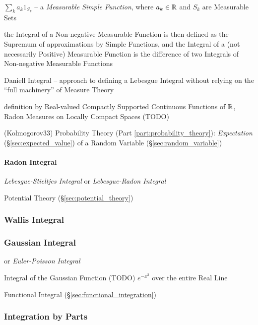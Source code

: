 $\sum_k a_k 1_{S_k}$ -- a \emph{Measurable Simple Function}, where
$a_k \in \mathbb{R}$ and $S_k$ are Measurable Sets

the Integral of a Non-negative Measurable Function is then defined as the
Supremum of approximations by Simple Functions, and the Integral of a (not
necessarily Positive) Measurable Function is the difference of two Integrals of
Non-negative Measurable Functions

Daniell Integral -- approach to defining a Lebesgue Integral without relying on
the ``full machinery'' of Measure Theory

definition by Real-valued Compactly Supported Continuous Functions of $\mathbb{R}$,
Radon Measures on Locally Compact Spaces
(TODO)

(Kolmogorov33) Probability Theory (Part \ref{part:probability_theory}):
\emph{Expectation} (\S\ref{sec:expected_value}) of a Random Variable
(\S\ref{sec:random_variable})



\paragraph{Radon Integral}\label{sec:radon_integral}\hfill

\emph{Lebesgue-Stieltjes Integral} or \emph{Lebesgue-Radon Integral}

Potential Theory (\S\ref{sec:potential_theory})



\subsubsection{Wallis Integral}\label{sec:wallis_integral}

\subsubsection{Gaussian Integral}\label{sec:gaussian_integral}

or \emph{Euler-Poisson Integral}

Integral of the Gaussian Function (TODO) $e^{-x^2}$ over the entire Real Line

\fist Functional Integral (\S\ref{sec:functional_integration})



\subsubsection{Integration by Parts}\label{sec:integration_by_parts}

